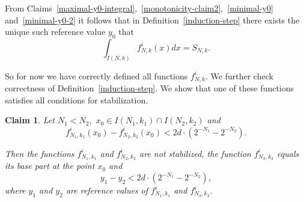 \documentclass[12pt]{article}
\newtheorem{clai}[prop]{Claim}
\theoremstyle{definition}
\begin{document}
From Claims~\ref{maximal-y0-integral},~\ref{monotonicity-claim2},~\ref{minimal-y0} and~\ref{minimal-y0-2} it follows that in Definition~\ref{induction-step} there exists the unique such reference value $y_0$ that
$$
\int_{I(N,k)}f_{N,k}^i(x)dx = S_{N,k}.
$$

So for now we have correctly defined all functions $f_{N,k}^i.$ We further check correctness of Definition~\ref{induction-step}. We show that one of these functions satisfies all conditions for stabilization.

\begin{clai}
\label{thin-consequence}
Let $N_1 < N_2,$ $x_0\in I(N_1,k_1)\cap I(N_2,k_2)$ and
\begin{equation}
\label{thin-inequality}
f_{N_1,k_1}^i(x_0) - f_{N_2, k_2}^i(x_0) < 2d\cdot\left(2^{-N_1} - 2^{-N_2}\right).
\end{equation}

Then the functions $f_{N_1,k_1}^i$ and $f_{N_2, k_2}^i$ are not stabilized, the function $f_{N_2, k_2}^i$ equals its base part at the point $x_0$ and
$$
y_1 - y_2 < 2d\cdot\left(2^{-N_1} - 2^{-N_2}\right),
$$
where $y_1$ and $y_2$ are reference values of $f_{N_1,k_1}^i$ and $f_{N_2, k_2}^i.$
\end{clai}
\end{document}
